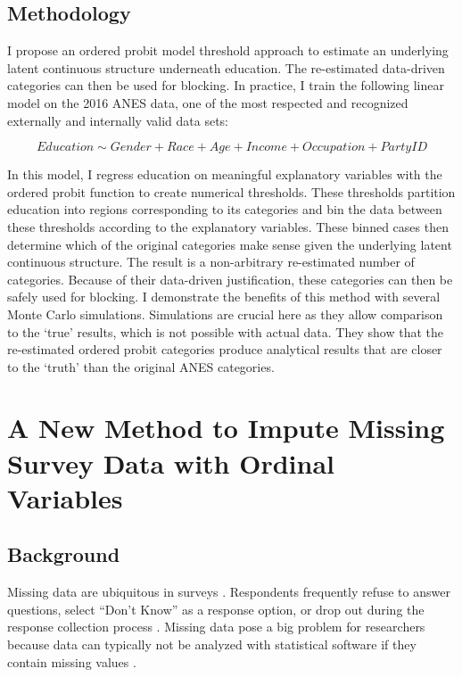 \documentclass[11pt]{article}
\begin{document}
\subsection{Methodology}

I propose an ordered probit model threshold approach to estimate an underlying latent continuous structure underneath education. The re-estimated data-driven categories can then be used for blocking. In practice, I train the following linear model on the 2016 ANES data, one of the most respected and recognized externally and internally valid data sets:

\vspace{-0.6cm}

\begin{equation}
Education \sim Gender + Race + Age + Income + Occupation + Party ID
\end{equation}

\vspace{-0.2cm}

In this model, I regress education on meaningful explanatory variables with the ordered probit function to create numerical thresholds. These thresholds partition education into regions corresponding to its categories and bin the data between these thresholds according to the explanatory variables. These binned cases then determine which of the original categories make sense given the underlying latent continuous structure. The result is a non-arbitrary re-estimated number of categories. Because of their data-driven justification, these categories can then be safely used for blocking. I demonstrate the benefits of this method with several Monte Carlo simulations. Simulations are crucial here as they allow comparison to the `true' results, which is not possible with actual data. They show that the re-estimated ordered probit categories produce analytical results that are closer to the `truth' than the original ANES categories.
 
 
 

\section{A New Method to Impute Missing Survey Data with Ordinal Variables} 

\subsection{Background}

Missing data are ubiquitous in surveys \citep{allison_2002_missing,raghunathan_2016_missing}. Respondents frequently refuse to answer questions, select ``Don't Know'' as a response option, or drop out during the response collection process \citep{honaker_2010_what}. Missing data pose a big problem for researchers because data can typically not be analyzed with statistical software if they contain missing values \citep{little_2002_statistical,molenberghs_2007_missing}. 
\end{document}
